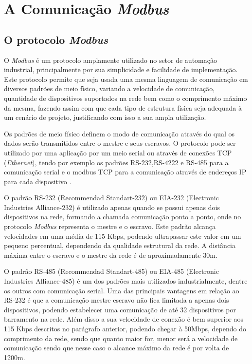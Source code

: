 \chapter{A Comunicação \textit{Modbus}}
\label{c:a_comunicacao_modbus}
\section{O protocolo \textit{Modbus}}

O \textit{Modbus} é um protocolo amplamente utilizado no setor de automação industrial, principalmente por sua simplicidade e facilidade de implementação. Este protocolo permite que seja usada uma mesma linguagem de comunicação em diversos padrões de meio físico, variando a velocidade de comunicação, quantidade de dispositivos suportados na rede bem como o comprimento máximo da mesma, fazendo assim com que cada tipo de estrutura física seja adequada à um cenário de projeto, justificando com isso a sua ampla utilização.

Os padrões de meio físico definem o modo de comunicação através do qual os dados serão transmitidos entre o mestre e seus escravos. O protocolo pode ser utilizado por uma aplicação por um meio serial ou através de conexões TCP (\textit{Ethernet}), tendo por exemplo os padrões RS-232,RS-4222 e RS-485 para a comunicação serial e o modbus TCP para a comunicação através de endereços IP para cada dispositivo \cite{dutertre2007formal}.

O padrão RS-232 (Recommendad Standart-232) ou EIA-232 (Electronic Industries Alliance-232) é utilizado apenas quando se possui apenas dois dispositivos na rede, formando a chamada comunicação ponto a ponto,  onde no protocolo \textit{Modbus} representa o mestre e o escravo. Este padrão alcança velocidades em uma média de 115 Kbps, podendo ultrapassar este valor em um pequeno percentual, dependendo da qualidade estrutural da rede. A distância máxima entre o escravo e o mestre da rede é de aproximadamente 30m.

O padrão RS-485 (Recommendad Standart-485) ou EIA-485 (Electronic Industries Alliance-485) é um dos padrões mais utilizados industrialmente, dentre os outros com comunicação serial. Uma das principais vantagens em relação ao RS-232 é que a comunicação mestre escravo não fica limitada a apenas dois dispositivos, podendo estabelecer uma comunicação de até 32 dispositivos por barramento na rede. Além disso a sua velocidade de conexão é bem superior aos 115 Kbps descritos no parágrafo anterior, podendo chegar à 50Mbps, dependo do comprimento da rede, sendo que quanto maior for, menor será a velocidade de comunicação sendo que nesse caso o alcance máximo da rede é por volta de 1200m.


